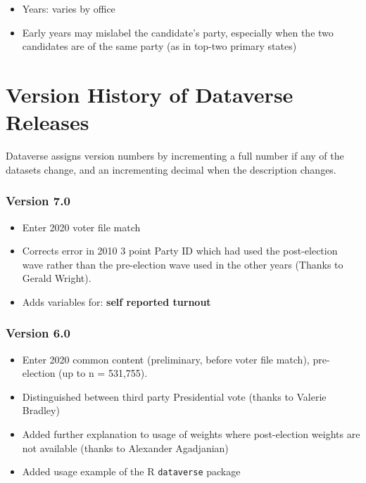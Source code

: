 \documentclass[10pt,article,oneside]{memoir}
\theoremstyle{definition}
\begin{document}
\begin{itemize}
\tightlist
\item
  Years: varies by office
\item
  Early years may mislabel the candidate's party, especially when the
  two candidates are of the same party (as in top-two primary states)
\end{itemize}

\newpage

\hypertarget{version-history-of-dataverse-releases}{%
\section{Version History of Dataverse
Releases}\label{version-history-of-dataverse-releases}}

Dataverse assigns version numbers by incrementing a full number if any
of the datasets change, and an incrementing decimal when the description
changes.

\hypertarget{version-7.0}{%
\subsubsection{Version 7.0}\label{version-7.0}}

\begin{itemize}
\tightlist
\item
  Enter 2020 voter file match
\item
  Corrects error in 2010 3 point Party ID which had used the
  post-election wave rather than the pre-election wave used in the other
  years (Thanks to Gerald Wright).
\item
  Adds variables for: \textbf{self reported turnout}
\end{itemize}

\hypertarget{version-6.0}{%
\subsubsection{Version 6.0}\label{version-6.0}}

\begin{itemize}
\tightlist
\item
  Enter 2020 common content (preliminary, before voter file match),
  pre-election (up to n = 531,755).
\item
  Distinguished between third party Presidential vote (thanks to Valerie
  Bradley)
\item
  Added further explanation to usage of weights where post-election
  weights are not available (thanks to Alexander Agadjanian)
\item
  Added usage example of the R \texttt{dataverse} package
\end{itemize}
\end{document}
